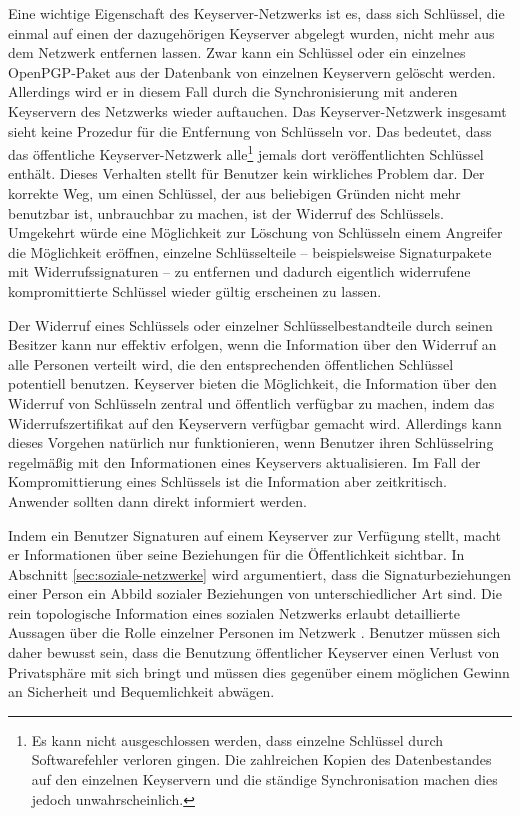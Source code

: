 Eine wichtige Eigenschaft des Keyserver-Netzwerks ist es, dass sich
Schlüssel, die einmal auf einen der dazugehörigen Keyserver
abgelegt wurden, nicht mehr aus dem Netzwerk entfernen lassen. Zwar
kann ein Schlüssel oder ein einzelnes OpenPGP-Paket aus der
Datenbank von einzelnen Keyservern gelöscht werden. Allerdings wird
er in diesem Fall durch die Synchronisierung mit anderen Keyservern
des Netzwerks wieder auftauchen. Das Keyserver-Netzwerk insgesamt
sieht keine Prozedur für die Entfernung von Schlüsseln vor. Das
bedeutet, dass das öffentliche Keyserver-Netzwerk alle\footnote{Es
  kann nicht ausgeschlossen werden, dass einzelne Schlüssel durch
  Softwarefehler verloren gingen. Die zahlreichen Kopien des
  Datenbestandes auf den einzelnen Keyservern und die ständige
  Synchronisation machen dies jedoch unwahrscheinlich.} jemals dort
veröffentlichten Schlüssel enthält. Dieses Verhalten stellt
für Benutzer kein wirkliches Problem dar. Der korrekte Weg, um einen
Schlüssel, der aus beliebigen Gründen nicht mehr benutzbar ist,
unbrauchbar zu machen, ist der Widerruf des Schlüssels. Umgekehrt
würde eine Möglichkeit zur Löschung von Schlüsseln einem
Angreifer die Möglichkeit eröffnen, einzelne Schlüsselteile --
beispielsweise Signaturpakete mit Widerrufssignaturen -- zu entfernen
und dadurch eigentlich widerrufene kompromittierte Schlüssel wieder
gültig erscheinen zu lassen.

Der Widerruf eines Schlüssels oder einzelner Schlüsselbestandteile
durch seinen Besitzer kann nur effektiv erfolgen, wenn die Information
über den Widerruf an alle Personen verteilt wird, die den
entsprechenden öffentlichen Schlüssel potentiell
benutzen. Keyserver bieten die Möglichkeit, die Information über
den Widerruf von Schlüsseln zentral und öffentlich verfügbar zu
machen, indem das Widerrufszertifikat auf den Keyservern verfügbar
gemacht wird. Allerdings kann dieses Vorgehen natürlich nur
funktionieren, wenn Benutzer ihren Schlüsselring regelmäßig mit
den Informationen eines Keyservers aktualisieren. Im Fall der
Kompromittierung eines Schlüssels ist die Information aber
zeitkritisch. Anwender sollten dann direkt informiert werden.

Indem ein Benutzer Signaturen auf einem Keyserver zur Verfügung
stellt, macht er Informationen über seine Beziehungen für die
Öffentlichkeit sichtbar. In Abschnitt \ref{sec:soziale-netzwerke}
wird argumentiert, dass die Signaturbeziehungen einer Person ein
Abbild sozialer Beziehungen von unterschiedlicher Art sind. Die rein
topologische Information eines sozialen Netzwerks erlaubt detaillierte
Aussagen über die Rolle einzelner Personen im
Netzwerk \cite{Carrington2005}. Benutzer müssen sich daher bewusst
sein, dass die Benutzung öffentlicher Keyserver einen Verlust von
Privatsphäre mit sich bringt und müssen dies gegenüber einem
möglichen Gewinn an Sicherheit und Bequemlichkeit abwägen.

